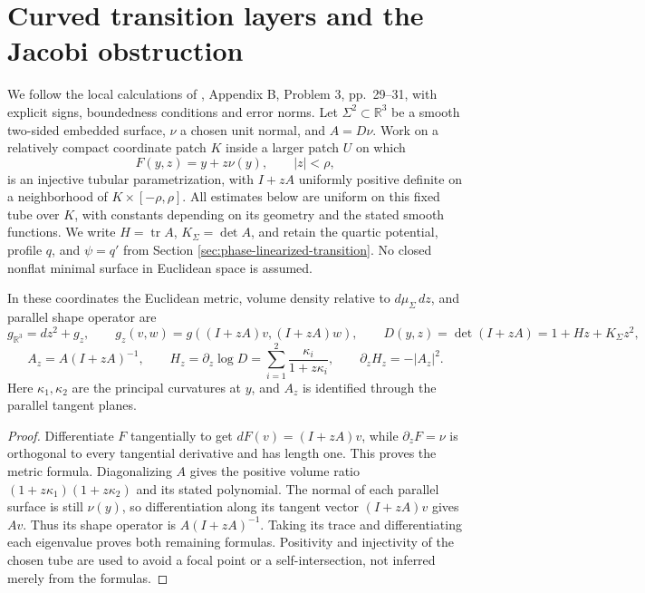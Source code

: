 \chapter{Curved transition layers and the Jacobi obstruction}\label{sec:phase-curved-transition}
We follow the local calculations of \cite{ChAC}, Appendix B, Problem 3, pp.~29--31, with explicit signs, boundedness conditions and error norms. Let $\Sigma^2\subset\mathbb R^3$ be a smooth two-sided embedded surface, $\nu$ a chosen unit normal, and $A=D\nu$. Work on a relatively compact coordinate patch $K$ inside a larger patch $U$ on which
\[
 F(y,z)=y+z\nu(y),\qquad |z|<\rho,
\]
is an injective tubular parametrization, with $I+zA$ uniformly positive definite on a neighborhood of $K\times[-\rho,\rho]$. All estimates below are uniform on this fixed tube over $K$, with constants depending on its geometry and the stated smooth functions. We write $H=\operatorname{tr}A$, $K_\Sigma=\det A$, and retain the quartic potential, profile $q$, and $\psi=q'$ from Section \ref{sec:phase-linearized-transition}. No closed nonflat minimal surface in Euclidean space is assumed.

\begin{lemma}\label{lem:phase-exact-fermi-geometry}
In these coordinates the Euclidean metric, volume density relative to $d\mu_\Sigma\,dz$, and parallel shape operator are
\[
 g_{\mathbb R^3}=dz^2+g_z,\qquad
 g_z(v,w)=g((I+zA)v,(I+zA)w),\qquad
 D(y,z)=\det(I+zA)=1+Hz+K_\Sigma z^2,
\]
\[
 A_z=A(I+zA)^{-1},\qquad
 H_z=\partial_z\log D=\sum_{i=1}^2\frac{\kappa_i}{1+z\kappa_i},
 \qquad \partial_zH_z=-|A_z|^2.
\]
Here $\kappa_1,\kappa_2$ are the principal curvatures at $y$, and $A_z$ is identified through the parallel tangent planes.
\end{lemma}
\begin{proof}
Differentiate $F$ tangentially to get $dF(v)=(I+zA)v$, while $\partial_zF=\nu$ is orthogonal to every tangential derivative and has length one. This proves the metric formula. Diagonalizing $A$ gives the positive volume ratio $(1+z\kappa_1)(1+z\kappa_2)$ and its stated polynomial. The normal of each parallel surface is still $\nu(y)$, so differentiation along its tangent vector $(I+zA)v$ gives $Av$. Thus its shape operator is $A(I+zA)^{-1}$. Taking its trace and differentiating each eigenvalue proves both remaining formulas. Positivity and injectivity of the chosen tube are used to avoid a focal point or a self-intersection, not inferred merely from the formulas.
\end{proof}

